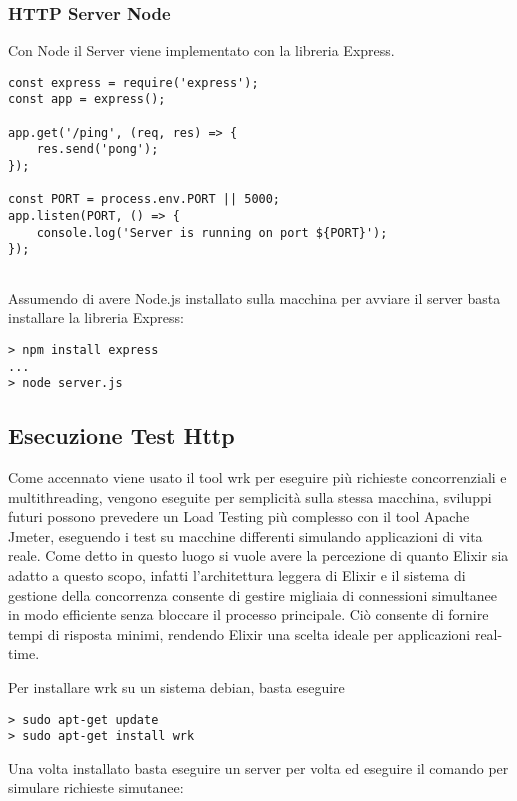\subsubsection{HTTP Server Node}

Con Node il Server viene implementato con la libreria Express.

\begin{lstlisting}[language=ipython, caption={Server Node(Express)},
	captionpos=b,label={lst:server_node}]
const express = require('express');
const app = express();
	
app.get('/ping', (req, res) => {
	res.send('pong');
});
	
const PORT = process.env.PORT || 5000; 
app.listen(PORT, () => {
	console.log('Server is running on port ${PORT}');
});
	
\end{lstlisting}

Assumendo di avere Node.js installato sulla macchina
per avviare il server basta installare la libreria Express:
\begin{lstlisting}[language=none]
> npm install express
...
> node server.js
\end{lstlisting}

\subsection{Esecuzione Test Http}

Come accennato viene usato il tool wrk per eseguire
più richieste concorrenziali e multithreading, vengono
eseguite per semplicità sulla stessa macchina, sviluppi
futuri possono prevedere un Load Testing più complesso
con il tool Apache Jmeter, eseguendo i test su
macchine differenti simulando applicazioni di vita reale.
Come detto in questo luogo si vuole
avere la percezione di quanto Elixir sia adatto a questo
scopo, infatti l'architettura leggera di Elixir e il sistema
di gestione della concorrenza consente di gestire
migliaia di connessioni simultanee in modo efficiente
senza bloccare il processo principale. Ciò consente
di fornire tempi di risposta minimi, rendendo Elixir
una scelta ideale per applicazioni real-time.

Per installare wrk su un sistema debian, basta eseguire
\begin{lstlisting}[language=none]
> sudo apt-get update
> sudo apt-get install wrk
\end{lstlisting}

Una volta installato basta eseguire un server per volta
ed eseguire il comando per simulare richieste simutanee:

